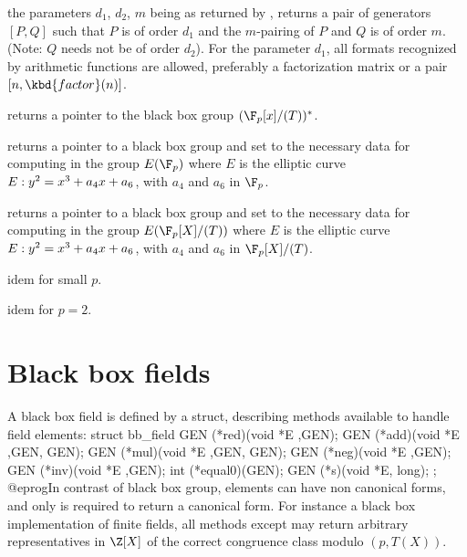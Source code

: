 the parameters $d_1$, $d_2$, $m$ being as returned by ,
returns a pair of generators $[P,Q]$ such that $P$ is of order $d_1$ and the
$m$-pairing of $P$ and $Q$ is of order $m$. (Note: $Q$ needs not be of order
$d_2$). For the parameter $d_1$, all formats recognized by arithmetic
functions are allowed, preferably a factorization matrix or a pair
$[n,\kbd{factor}(n)]$.



returns a pointer to the black box group $(\F_p[x]/(T))^*$.

returns a pointer to a black box group and set  to the necessary data for
computing in the group $E(\F_p)$ where $E$ is the elliptic curve $E:y^2=x^3+a_4\*x+a_6$,
with $a_4$ and $a_6$ in $\F_p$.

returns a pointer to a black box group and set  to the necessary data for
computing in the group $E(\F_p[X]/(T))$ where $E$ is the elliptic curve $E:y^2=x^3+a_4\*x+a_6$,
with $a_4$ and $a_6$ in $\F_p[X]/(T)$.

 idem for small $p$.

idem for $p=2$.

\section{Black box fields}

A black box field is defined by a  struct, describing methods
available to handle field elements:
\bprog
  struct bb_field
  {
    GEN (*red)(void *E ,GEN);
    GEN (*add)(void *E ,GEN, GEN);
    GEN (*mul)(void *E ,GEN, GEN);
    GEN (*neg)(void *E ,GEN);
    GEN (*inv)(void *E ,GEN);
    int (*equal0)(GEN);
    GEN (*s)(void *E, long);
  };
@eprog\noindent In contrast of black box group, elements can have
non canonical forms, and only  is required to return a canonical form.
For instance a black box implementation of finite fields, all methods
except  may return arbitrary representatives in $\Z[X]$ of the
correct congruence class modulo $(p,T(X))$.

